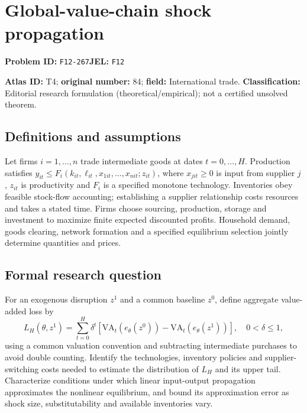 \documentclass[11pt,a4paper]{article}
\begin{document}
\section*{Global-value-chain shock propagation}
\textbf{Problem ID:} \texttt{F12-267}\quad \textbf{JEL:} \texttt{F12}\par
\label{problem:OP-0084}
\label{atlas:prob:T4}

\noindent\textbf{Atlas ID:} T4; \textbf{original number:} 84; \textbf{field:} International trade. \textbf{Classification:} Editorial research formulation (theoretical/empirical); not a certified unsolved theorem.

\subsection*{Definitions and assumptions}
Let firms $i=1,\ldots,n$ trade intermediate goods at dates $t=0,\ldots,H$. Production satisfies $y_{it}\le F_i(k_{it},\ell_{it},x_{1it},\ldots,x_{nit};z_{it})$, where $x_{jit}\ge0$ is input from supplier $j$, $z_{it}$ is productivity and $F_i$ is a specified monotone technology. Inventories obey feasible stock-flow accounting; establishing a supplier relationship costs resources and takes a stated time. Firms choose sourcing, production, storage and investment to maximize finite expected discounted profits. Household demand, goods clearing, network formation and a specified equilibrium selection jointly determine quantities and prices.

\subsection*{Formal research question}
For an exogenous disruption $z^1$ and a common baseline $z^0$, define aggregate value-added loss by
\[
 L_H(\theta,z^1)=\sum_{t=0}^{H}\delta^t
 [\mathrm{VA}_t(e_\theta(z^0))-\mathrm{VA}_t(e_\theta(z^1))],\quad 0<\delta\le1,
\]
using a common valuation convention and subtracting intermediate purchases to avoid double counting. Identify the technologies, inventory policies and supplier-switching costs needed to estimate the distribution of $L_H$ and its upper tail. Characterize conditions under which linear input-output propagation approximates the nonlinear equilibrium, and bound its approximation error as shock size, substitutability and available inventories vary.
\end{document}
